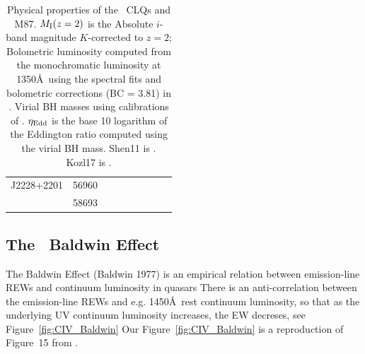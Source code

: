 \documentclass[a4paper,fleqn,usenatbib]{mnras}
\begin{document}
\begin{table}
\begin{tabular}{l l  ll ll cc r}
    J2228+2201       & 56960                          &                                       &                                                &                              &                               &                 &                                        & \\
                              & 58693                          &                                       &                                               &                               &                                &                &                   &  \\
    \hline
     \hline
    \hline
  \end{tabular}
  \caption{Physical properties of the \civ\ CLQs and M87.
     $M_{\rm I}(z=2)$ is the Absolute $i$-band magnitude $K$-corrected to $z = 2$; Bolometric luminosity computed from the
        monochromatic luminosity at 1350\AA\ using the spectral fits and
        bolometric corrections (BC = 3.81) in \citet{Richards2006b}.
        Virial BH masses using calibrations of \citet{VestergaardPeterson2006}.
         $\eta_{\rm Edd}$ is the base 10 logarithm of the Eddington ratio computed using the virial BH mass.
        Shen11 is \citet{Shen2011}. 
        Kozl17 is \citet{Kozlowski2017}. }
\label{tab:Eddington_ratios} 
\end{table}

\subsection{The \civ\ Baldwin Effect}
The Baldwin Effect (Baldwin 1977) is an empirical %
relation between emission-line REWs and continuum luminosity in
quasars \citep[][]{Shields2007, Hamann2017, Calderone2017}
There is an anti-correlation between the emission-line REWs and
e.g. 1450\AA\ rest continuum luminosity, so that as the underlying UV
continuum luminosity increases, the EW decreses, see
Figure~\ref{fig:CIV_Baldwin} Our Figure~\ref{fig:CIV_Baldwin} is a
reproduction of Figure~15 from \citet{Calderone2017}.
\end{document}
